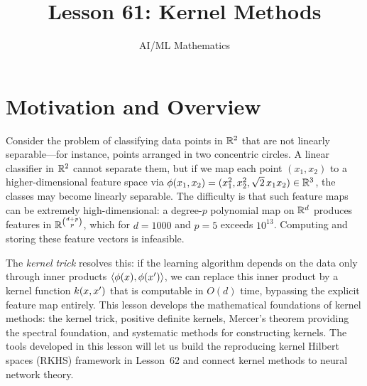\documentclass[11pt,a4paper]{article}
\title{Lesson 61: Kernel Methods}
\author{AI/ML Mathematics}
\date{}
\begin{document}
\maketitle
\tableofcontents
\newpage


\section{Motivation and Overview}
\label{sec:motivation}

Consider the problem of classifying data points in $\mathbb{R}^2$ that are not
linearly separable---for instance, points arranged in two concentric
circles. A linear classifier in $\mathbb{R}^2$ cannot separate them, but
if we map each point $(x_1, x_2)$ to a higher-dimensional feature
space via $\phi(x_1, x_2) = (x_1^2, x_2^2, \sqrt{2}\, x_1 x_2)
\in \mathbb{R}^3$, the classes may become linearly separable. The difficulty
is that such feature maps can be extremely high-dimensional: a
degree-$p$ polynomial map on $\mathbb{R}^d$ produces features in
$\mathbb{R}^{\binom{d+p}{p}}$, which for $d = 1000$ and $p = 5$ exceeds
$10^{13}$. Computing and storing these feature vectors is infeasible.

The \emph{kernel trick} resolves this: if the learning algorithm
depends on the data only through inner products
$\langle \phi(x), \phi(x') \rangle$, we can replace
this inner product by a kernel function $k(x, x')$ that
is computable in $O(d)$ time, bypassing the explicit
feature map entirely. This lesson develops the mathematical
foundations of kernel methods: the kernel trick, positive definite
kernels, Mercer's theorem providing the spectral foundation, and
systematic methods for constructing kernels. The tools developed in
this lesson will let us build the reproducing kernel Hilbert spaces
(RKHS) framework in Lesson~62 and connect kernel methods to neural
network theory.
\end{document}
